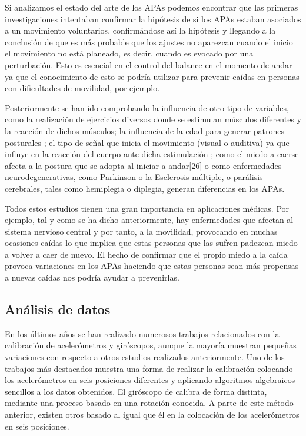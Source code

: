 Si analizamos el estado del arte de los APAs podemos encontrar que las primeras investigaciones intentaban confirmar la hipótesis de si los APAs estaban asociados a un movimiento voluntarios, confirmándose así la hipótesis y llegando a la conclusión de que es más probable que los ajustes no aparezcan cuando el inicio el movimiento no está planeado, es decir, cuando es evocado por una perturbación. Esto es esencial en el control del balance en el momento de andar ya que el conocimiento de esto se podría utilizar para prevenir caídas en personas con dificultades de movilidad, por ejemplo.\cite{Mcllroy1993}\cite{Yiou2012}\cite{Teddy2013}\cite{Bouisset2008}\cite{Neeta2014}

Posteriormente se han ido comprobando la influencia de otro tipo de variables, como la realización de ejercicios diversos donde se estimulan músculos diferentes y la reacción de dichos músculos\cite{Gay2011}; la influencia de la edad para generar patrones posturales \cite{Bleuse2006} \cite{Estelle2008}; el tipo de señal que inicia el movimiento (visual o auditiva) ya que influye en la reacción del cuerpo ante dicha estimulación \cite{Mcllroy1993}\cite{Antonia2009}\cite{Vicent1999}\cite{Tard2013}; como el miedo a caerse afecta a la postura que se adopta al iniciar a andar[26] o como enfermedades neurodegenerativas, como Parkinson o la Esclerosis múltiple\cite{Mancini2009}\cite{Jebb2008}\cite{Chris2005}\cite{Hall2013}, o parálisis cerebrales, tales como hemiplegia o diplegia\cite{Hall2013}, generan diferencias en los APAs.

Todos estos estudios tienen una gran importancia en aplicaciones médicas. Por ejemplo, tal y como se ha dicho anteriormente, hay enfermedades que afectan al sistema nervioso central y por tanto, a la movilidad, provocando en muchas ocasiones caídas lo que implica que estas personas que las sufren padezcan miedo a volver a caer de nuevo. El hecho de confirmar que el propio miedo a la caída provoca variaciones en los APAs haciendo que estas personas sean más propensas a nuevas caídas nos podría ayudar a prevenirlas.

\subsection{An\'alisis de datos}

En los últimos años se han realizado numerosos trabajos relacionados con la calibración de acelerómetros y giróscopos, aunque la mayoría muestran pequeñas variaciones con respecto a otros estudios realizados anteriormente. Uno de los trabajos más destacados \cite{Kian2011}muestra una forma de realizar la calibración colocando los acelerómetros en seis posiciones diferentes y aplicando algoritmos algebraicos sencillos a los datos obtenidos. El giróscopo de calibra de forma distinta, mediante una proceso basado en una rotación conocida. A parte de este método anterior, existen otros basado al igual que él en la colocación de los acelerómetros en seis posiciones.

